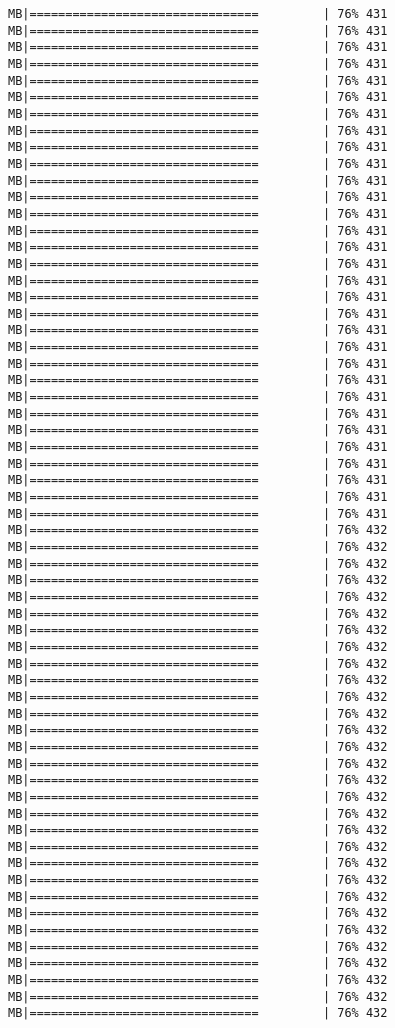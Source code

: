 \documentclass[
]{article}
\begin{document}
\begin{verbatim}
MB|================================         | 76% 431 MB|================================         | 76% 431 MB|================================         | 76% 431 MB|================================         | 76% 431 MB|================================         | 76% 431 MB|================================         | 76% 431 MB|================================         | 76% 431 MB|================================         | 76% 431 MB|================================         | 76% 431 MB|================================         | 76% 431 MB|================================         | 76% 431 MB|================================         | 76% 431 MB|================================         | 76% 431 MB|================================         | 76% 431 MB|================================         | 76% 431 MB|================================         | 76% 431 MB|================================         | 76% 431 MB|================================         | 76% 431 MB|================================         | 76% 431 MB|================================         | 76% 431 MB|================================         | 76% 431 MB|================================         | 76% 431 MB|================================         | 76% 431 MB|================================         | 76% 431 MB|================================         | 76% 431 MB|================================         | 76% 431 MB|================================         | 76% 431 MB|================================         | 76% 431 MB|================================         | 76% 431 MB|================================         | 76% 431 MB|================================         | 76% 431 MB|================================         | 76% 432 MB|================================         | 76% 432 MB|================================         | 76% 432 MB|================================         | 76% 432 MB|================================         | 76% 432 MB|================================         | 76% 432 MB|================================         | 76% 432 MB|================================         | 76% 432 MB|================================         | 76% 432 MB|================================         | 76% 432 MB|================================         | 76% 432 MB|================================         | 76% 432 MB|================================         | 76% 432 MB|================================         | 76% 432 MB|================================         | 76% 432 MB|================================         | 76% 432 MB|================================         | 76% 432 MB|================================         | 76% 432 MB|================================         | 76% 432 MB|================================         | 76% 432 MB|================================         | 76% 432 MB|================================         | 76% 432 MB|================================         | 76% 432 MB|================================         | 76% 432 MB|================================         | 76% 432 MB|================================         | 76% 432 MB|================================         | 76% 432 MB|================================         | 76% 432 MB|================================         | 76% 432 MB|================================         | 76% 432 
\end{verbatim}
\end{document}
